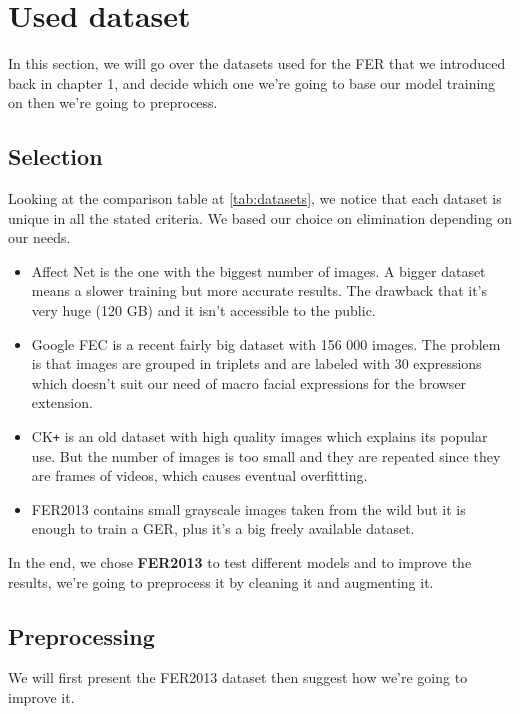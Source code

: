 \documentclass[12pt,a4paper,oneside,english]{book}
\begin{document}
\section{Used dataset}
In this section, we will go over the datasets used for the FER that we introduced back in chapter 1, and decide which one we're going to base our model training on then we're going to preprocess.

\subsection{Selection}
Looking at the comparison table at \autoref{tab:datasets}, we notice that each dataset is unique in all the stated criteria. We based our choice on elimination depending on our needs.
\begin{itemize}
\item Affect Net is the one with the biggest number of images. A bigger dataset means a slower training but more accurate results. The drawback that it's very huge (120 GB) and it isn't accessible to the public.
\item Google FEC is a recent fairly big dataset with 156 000 images. The problem is that images are grouped in triplets and are labeled with 30 expressions which doesn't suit our need of macro facial expressions for the browser extension.
\item CK\texttt{+} is an old dataset with high quality images which explains its popular use. But the number of images is too small and they are repeated since they are frames of videos, which causes eventual overfitting.
\item FER2013 contains small grayscale images taken from the wild but it is enough to train a GER, plus it's a big freely available dataset.
\end{itemize}
In the end, we chose \textbf{FER2013} to test different models and to improve the results, we're going to preprocess it by cleaning it and augmenting it.

\subsection{Preprocessing}
We will first present the FER2013 dataset then suggest how we're going to improve it.
\end{document}
